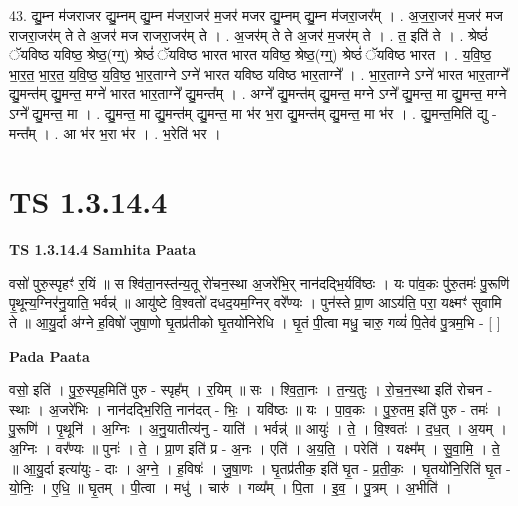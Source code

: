\documentclass[17pt]{extarticle}
\begin{document}
43. द्यु॒म्न म॑जराजर द्यु॒म्नम् द्यु॒म्न म॑जरा॒जर॑ म॒जर॑ मजर द्यु॒म्नम् द्यु॒म्न म॑जरा॒जर᳚म् । . अ॒ज॒रा॒जर॑ म॒जर॑ मज राजरा॒जर॑म् ते ते अ॒जर॑ मज राजरा॒जर॑म् ते । . अ॒जर॑म् ते ते अ॒जर॑ म॒जर॑म् ते । . त॒ इति॑ ते । . श्रेष्ठं॑ ॅयविष्ठ यविष्ठ॒ श्रेष्ठ॒(ग्ग्॒) श्रेष्ठं॑ ॅयविष्ठ भारत भारत यविष्ठ॒ श्रेष्ठ॒(ग्ग्॒) श्रेष्ठं॑ ॅयविष्ठ भारत । . य॒वि॒ष्ठ॒ भा॒र॒त॒ भा॒र॒त॒ य॒वि॒ष्ठ॒ य॒वि॒ष्ठ॒ भा॒र॒ताग्ने ऽग्ने॑ भारत यविष्ठ यविष्ठ भार॒ताग्ने᳚ । . भा॒र॒ताग्ने ऽग्ने॑ भारत भार॒ताग्ने᳚ द्यु॒मन्त॑म् द्यु॒मन्त॒ मग्ने॑ भारत भार॒ताग्ने᳚ द्यु॒मन्त᳚म् । . अग्ने᳚ द्यु॒मन्त॑म् द्यु॒मन्त॒ मग्ने ऽग्ने᳚ द्यु॒मन्त॒ मा द्यु॒मन्त॒ मग्ने ऽग्ने᳚ द्यु॒मन्त॒ मा । . द्यु॒मन्त॒ मा द्यु॒मन्त॑म् द्यु॒मन्त॒ मा भ॑र भ॒रा द्यु॒मन्त॑म् द्यु॒मन्त॒ मा भ॑र । . द्यु॒मन्त॒मिति॑ द्यु - मन्त᳚म् । . आ भ॑र भ॒रा भ॑र । . भ॒रेति॑ भर । \newline
\pagebreak
{}

\section{ TS 1.3.14.4 }

\textbf{TS 1.3.14.4 } \newline
\textbf{Samhita Paata} \newline

वसो॑ पुरु॒स्पृहꣳ॑ र॒यिं ॥ स श्वि॑ता॒नस्त॑न्य॒तू रो॑चन॒स्था अ॒जरे॑भि॒र् नान॑दद्भि॒र्यवि॑ष्ठः । यः पा॑व॒कः पु॑रु॒तमः॑ पु॒रूणि॑ पृ॒थून्य॒ग्निर॑नु॒याति॒ भर्वन्न्॑ ॥ आयु॑ष्टे वि॒श्वतो॑ दधद॒यम॒ग्निर् वरे᳚ण्यः । पुन॑स्ते प्रा॒ण आऽय॑ति॒ परा॒ यक्ष्मꣳ॑ सुवामि ते ॥ आ॒यु॒र्दा अ॑ग्ने ह॒विषो॑ जुषा॒णो घृ॒तप्र॑तीको घृ॒तयो॑निरेधि । घृ॒तं पी॒त्वा मधु॒ चारु॒ गव्यं॑ पि॒तेव॑ पु॒त्रम॒भि - [ ] \newline

\textbf{Pada Paata} \newline

वसो॒ इति॑ । पु॒रु॒स्पृह॒मिति॑ पुरु - स्पृह᳚म् । र॒यिम् ॥ सः । श्वि॒ता॒नः । त॒न्य॒तुः । रो॒च॒न॒स्था इति॑ रोचन - स्थाः । अ॒जरे॑भिः । नान॑दद्भि॒रिति॒ नान॑दत् - भिः॒ । यवि॑ष्ठः ॥ यः । पा॒व॒कः । पु॒रु॒तम॒ इति॑ पुरु - तमः॑ । पु॒रूणि॑ । पृ॒थूनि॑ । अ॒ग्निः । अ॒नु॒यातीत्य॑नु - याति॑ । भर्वन्न्॑ ॥ आयुः॑ । ते॒ । वि॒श्वतः॑ । द॒ध॒त् । अ॒यम् । अ॒ग्निः । वर᳚ण्यः ॥ पुनः॑ । ते॒ । प्रा॒ण इति॑ प्र - अ॒नः । एति॑ । अ॒य॒ति॒ । परेति॑ । यक्ष्म᳚म् । सु॒वा॒मि॒ । ते॒ ॥ आ॒यु॒र्दा इत्या॑युः - दाः । अ॒ग्ने॒ । ह॒विषः॑ । जु॒षा॒णः । घृ॒तप्र॑तीक॒ इति॑ घृ॒त - प्र॒ती॒कः॒ । घृ॒तयो॑नि॒रिति॑ घृ॒त - यो॒निः॒ । ए॒धि॒ ॥ घृ॒तम् । पी॒त्वा । मधु॑ । चारु॑ । गव्य᳚म् । पि॒ता । इ॒व॒ । पु॒त्रम् । अ॒भीति॑ ।  \newline
\end{document}
